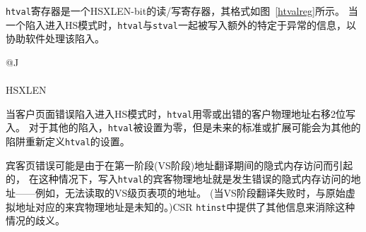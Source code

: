 {\tt htval}寄存器是一个HSXLEN-bit的读/写寄存器，其格式如图~\ref{htvalreg}所示。
当一个陷入进入HS模式时，{\tt htval}与{\tt stval}一起被写入额外的特定于异常的信息，以协助软件处理该陷入。

\begin{figure*}[h!]
{\footnotesize
\begin{center}
\begin{tabular}{@{}J}
 \\
\hline
{} \\
\hline
HSXLEN \\
\end{tabular}
\end{center}
}
\vspace{-0.1in}
\caption{超级监管器陷入值寄存器（{\tt htval}）。
  }
\label{htvalreg}
\end{figure*}

当客户页面错误陷入进入HS模式时，{\tt htval}用零或出错的客户物理地址右移2位写入。
对于其他的陷入，{\tt htval}被设置为零，但是未来的标准或扩展可能会为其他的陷阱重新定义{\tt htval}的设置。

宾客页错误可能是由于在第一阶段(VS阶段)地址翻译期间的隐式内存访问而引起的，
在这种情况下，写入{\tt htval}的宾客物理地址就是发生错误的隐式内存访问的地址——例如，无法读取的VS级页表项的地址。
(当VS阶段翻译失败时，与原始虚拟地址对应的来宾物理地址是未知的。)CSR {\tt htinst}中提供了其他信息来消除这种情况的歧义。

